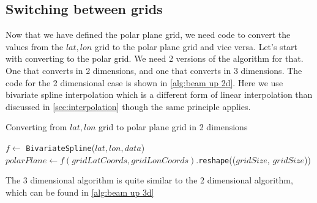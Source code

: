 \subsection{Switching between grids}
Now that we have defined the polar plane grid, we need code to convert the values from the $lat, lon$ grid to the polar plane grid and vice versa. Let's start with converting to the polar grid. 
We need 2 versions of the algorithm for that. One that converts in 2 dimensions, and one that converts in 3 dimensions. The code for the 2 dimensional case is shown in \autoref{alg:beam up 2d}.
Here we use bivariate spline interpolation \cite{bivariatespline} which is a different form of linear interpolation than discussed in \autoref{sec:interpolation} though the same principle 
applies.

\begin{algorithm}[htb]
    \caption{Converting from $lat, lon$ grid to polar plane grid in 2 dimensions}
    \label{alg:beam up 2d}
    $f \leftarrow $ \texttt{BivariateSpline}($lat, lon, data$) 
    $polarPlane \leftarrow f(gridLatCoords, gridLonCoords).$\texttt{reshape}(($gridSize$, $gridSize$)) 
\end{algorithm}

The 3 dimensional algorithm is quite similar to the 2 dimensional algorithm, which can be found in \autoref{alg:beam up 3d}

